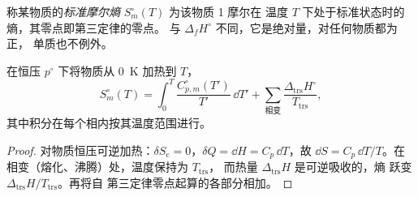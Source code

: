 \begin{definition}[标准摩尔熵]\label{def:b2:reaction-free-energy:standard-entropy}
称某物质的\emph{标准摩尔熵}
$S^\circ_m(T)$ 为该物质 1 摩尔在
温度 $T$ 下处于标准状态时的熵，其零点即第三定律的零点。
与 $\Delta_f H^\circ$ 不同，它是绝对量，对任何物质都为正，
单质也不例外。
\end{definition}

\begin{proposition}[由热容求绝对熵]\label{prop:b2:reaction-free-energy:absolute-entropy}
在恒压 $p^\circ$ 下将物质从 \qty{0}{K} 加热到 $T$，
\[
  S^\circ_m(T) = \int_0^T\frac{C^\circ_{p,m}(T')}{T'}\,\dd T' +
  \sum_{\text{相变}}\frac{\Delta_{\text{trs}}H^\circ}{T_{\text{trs}}} ,
\]
其中积分在每个相内按其温度范围进行。
\end{proposition}

\begin{proof}
对物质恒压可逆加热：$\delta S_{\text{c}} =
0$，$\delta Q = \dd H = C_p\,\dd T$，故 $\dd S = C_p\,\dd T/T$。在
相变（熔化、沸腾）处，温度保持为 $T_{\text{trs}}$，
而热量 $\Delta_{\text{trs}}H$ 是可逆吸收的，熵
跃变 $\Delta_{\text{trs}}H/T_{\text{trs}}$。再将自
第三定律零点起算的各部分相加。
\end{proof}

